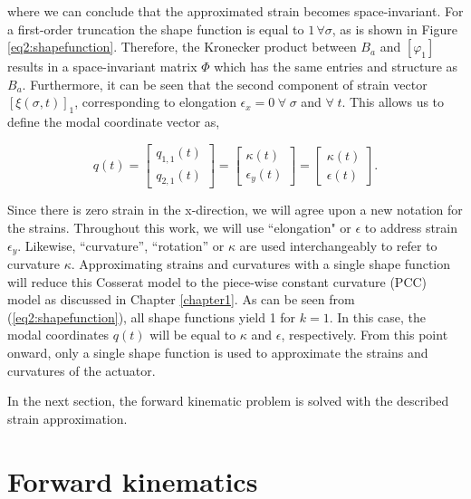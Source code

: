 where we can conclude that the approximated strain becomes space-invariant. For a first-order truncation the shape function is equal to $1 \hspace{2pt} \forall \sigma$, as is shown in Figure \ref{eq2:shapefunction}. Therefore, the Kronecker product between $B_a$ and $[\varphi_1]$ results in a space-invariant matrix $\Phi$ which has the same entries and structure as $B_a$. Furthermore, it can be seen that the second component of strain vector $[\xi(\sigma,t)]_1$, corresponding to elongation $\epsilon_x = 0 \hspace{3pt} \forall \hspace{3pt} \sigma $ and $ \forall \hspace{3pt} t$. This allows us to define the modal coordinate vector as,


\begin{equation}
q(t) = \begin{bmatrix} q_{1,1}(t) \\ q_{2,1}(t) \end{bmatrix} = \begin{bmatrix} \kappa(t) \\ \epsilon_y(t) \end{bmatrix} = \begin{bmatrix} \kappa(t) \\ \epsilon(t) \end{bmatrix}.
\end{equation}

Since there is zero strain in the x-direction, we will agree upon a new notation for the strains. Throughout this work, we will use ``elongation" or $\epsilon$ to address strain $\epsilon_y$. Likewise, ``curvature'', ``rotation'' or  $\kappa$ are used interchangeably to refer to curvature $\kappa$. Approximating strains and curvatures with a single shape function will reduce this Cosserat model to the piece-wise constant curvature (PCC) model as discussed in Chapter \ref{chapter1}. As can be seen from (\ref{eq2:shapefunction}), all shape functions yield 1 for $k=1$. In this case, the modal coordinates $q(t)$ will be equal to $\kappa$ and $\epsilon$, respectively. From this point onward, only a single shape function is used to approximate the strains and curvatures of the actuator. 

In the next section, the forward kinematic problem is solved with the described strain approximation.




\section{Forward kinematics}


